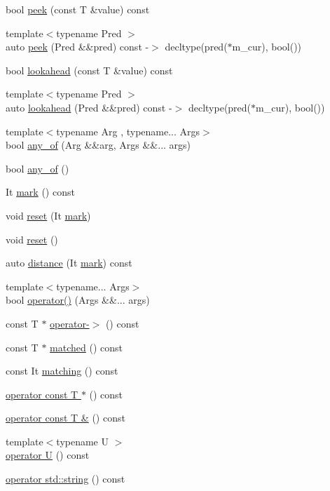 \begin{DoxyCompactItemize}
\item 
bool \hyperlink{class_matcher_a28b154cbc4cb7ae203810043e069ae38}{peek} (const T \&value) const
\item 
{\footnotesize template$<$typename Pred $>$ }\\auto \hyperlink{class_matcher_a4c92e3958c64eee29812f4ed75c331cf}{peek} (Pred \&\&pred) const -\/$>$ decltype(pred($\ast$m\+\_\+cur), bool())
\item 
bool \hyperlink{class_matcher_ab2141c8f5c1d61b41f9d9f70f88e6697}{lookahead} (const T \&value) const
\item 
{\footnotesize template$<$typename Pred $>$ }\\auto \hyperlink{class_matcher_a9e9a6c37a2de57596fa66dae29fe7b51}{lookahead} (Pred \&\&pred) const -\/$>$ decltype(pred($\ast$m\+\_\+cur), bool())
\item 
{\footnotesize template$<$typename Arg , typename... Args$>$ }\\bool \hyperlink{class_matcher_a1db8b27d158ba0010bf7c69559773112}{any\+\_\+of} (Arg \&\&arg, Args \&\&... args)
\item 
bool \hyperlink{class_matcher_a6cfab4944429c85a33d872691e0976c8}{any\+\_\+of} ()
\item 
It \hyperlink{class_matcher_af9135752ac195a21c230267d52db6623}{mark} () const
\item 
void \hyperlink{class_matcher_abb67aa2acac25b34d80ffb2e64eef44c}{reset} (It \hyperlink{class_matcher_af9135752ac195a21c230267d52db6623}{mark})
\item 
void \hyperlink{class_matcher_a18de8d97996c28deb6ac787f2a0981a6}{reset} ()
\item 
auto \hyperlink{class_matcher_aeaa3afef2409a98c71a1dec0c0bc32b2}{distance} (It \hyperlink{class_matcher_af9135752ac195a21c230267d52db6623}{mark}) const
\item 
{\footnotesize template$<$typename... Args$>$ }\\bool \hyperlink{class_matcher_a2c1cbd69f6fcbbcf40e9e66333cfddca}{operator()} (Args \&\&... args)
\item 
const T $\ast$ \hyperlink{class_matcher_a3613bf19482915302d6647e25d9facb2}{operator-\/$>$} () const
\item 
const T $\ast$ \hyperlink{class_matcher_a6a43511495d338b4572dcb52e96fc3a3}{matched} () const
\item 
const It \hyperlink{class_matcher_abf9d0a1f24372dc9dde031ae6df26921}{matching} () const
\item 
\hyperlink{class_matcher_ae3f74b07e355126855e40db722c7a51d}{operator const T $\ast$} () const
\item 
\hyperlink{class_matcher_a7b808eac9d5d10c2d417869bf630d6ec}{operator const T \&} () const
\item 
{\footnotesize template$<$typename U $>$ }\\\hyperlink{class_matcher_a0bd21eb19304624235c6cb208fa1216a}{operator U} () const
\item 
\hyperlink{class_matcher_adc54a96fcfc40186d82a91baeb09211c}{operator std\+::string} () const
\end{DoxyCompactItemize}



